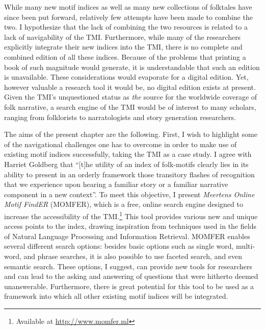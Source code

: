 While many new motif indices\autocite[See e.g.][]{baughman:1966,ideka:1971,kirtley:1977,childers:1977,flowers:1980,neuland:1981,el-shamy:1995} as well as many new collections of folktales\autocite{el-shamy:1980,meder:2000,slone:2001,crooke:2002} have since been put forward, relatively few attempts have been made to combine the two\autocites[Although see, in recent years][]{ben-amons:2006,slone:2001}[For further examples of both motif indices as well as folktale collections, see][]{uther:1996}. I hypothesize that the lack of combining the two resources is related to a lack of navigability of the TMI. Furthermore, while many of the researchers explicitly integrate their new indices into the TMI\autocite[For a brief and recent example, see][]{bell:2009}, there is no complete and combined edition of all these indices. Because of the problems that printing a book of such magnitude would generate, it is understandable that such an edition is unavailable. These considerations would evaporate for a digital edition. Yet, however valuable a research tool it would be, no digital edition exists at present. Given the TMI's unquestioned status as \emph{the} source for the worldwide coverage of folk narrative, a search engine of the TMI would be of interest to many scholars, ranging from folklorists to narratologists and story generation researchers.

The aims of the present chapter are the following. First, I wish to highlight some of the navigational challenges one has to overcome in order to make use of existing motif indices successfully, taking the TMI as a case study. I agree with Harriet Goldberg that ``[t]he utility of an index of folk-motifs clearly lies in its ability to present in an orderly framework those transitory flashes of recognition that we experience upon hearing a familiar story or a familiar narrative component in a new context''\autocite[xiii]{goldberg:1998}. To meet this objective, I present \emph{Meertens Online Motif FindER} (MOMFER), which is a free, online search engine designed to increase the accessibility of the TMI.\footnote{Available at \url{http://www.momfer.ml}} This tool provides various new and unique access points to the index, drawing inspiration from techniques used in the fields of Natural Language Processing and Information Retrieval.\autocite[For a similar approach that attempts to enrich the motif index with semantic information, cf.][]{declerck:2011} MOMFER enables several different search options: besides basic options such as single word, multi-word, and phrase searches, it is also possible to use faceted search, and even semantic search. These options, I suggest, can provide new tools for researchers and can lead to the asking and answering of questions that were hitherto deemed unanswerable. Furthermore, there is great potential for this tool to be used as a framework into which all other existing motif indices will be integrated.

